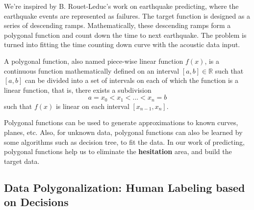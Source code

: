 \documentclass[
twocolumn,
]{ceurart}
\begin{document}

We're inspired by B. Rouet-Leduc's work \cite{rouet2017machine} on earthquake predicting, where the earthquake events are represented as failures. The target function is designed as a series of descending ramps. Mathematically, these descending ramps form a polygonal function and count down the time to next earthquake. The problem is turned into fitting the time counting down curve with the acoustic data input.

A polygonal function, also named piece-wise linear function $f(x)$, is a continuous function mathematically defined on an interval $[a, b]\in \mathbb R$ such that $[a, b]$ can be divided into a set of intervals on each of which the function is a linear function, that is, there exists a subdivision 
\begin{equation}
    a=x_0 < x_1 < ... < x_n=b
\end{equation}
such that $f(x)$ is linear on each interval $[x_{n-1}, x_n]$.

Polygonal functions can be used to generate approximations to known curves, planes, etc. Also, for unknown data, polygonal functions can also be learned by some algorithms such as decision tree, to fit the data. In our work of predicting, polygonal functions help us to eliminate the \textbf{hesitation} area, and build the target data.

\subsection{Data Polygonalization: Human Labeling based on Decisions}
\end{document}
